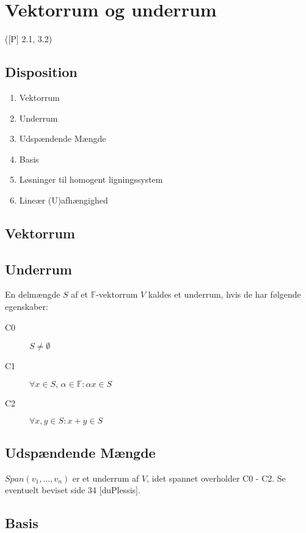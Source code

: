 \newpage
\chapter{Vektorrum og underrum}
([P] 2.1, 3.2)

\section*{Disposition}
\begin{enumerate}
	\item Vektorrum
	\item Underrum
	\item Udspændende Mængde
	\item Basis
	\item Løsninger til homogent ligningssystem
	\item Lineær (U)afhængighed
\end{enumerate}

\section{Vektorrum}




\section{Underrum}
\hypertarget{def:underrum}{}
En delmængde $S$ af et $\mathbb{F}$-vektorrum $V$ kaldes et underrum, hvis de
har følgende egenskaber:
\begin{description}
	\item[C0] $S \not= \emptyset$
	\item[C1] $\forall x \in S, \, \alpha \in \mathbb{F} \colon \alpha x \in S$
	\item[C2] $\forall x,y \in S \colon x + y \in S$
\end{description}

\section{Udspændende Mængde}


$Span(v_1,\dots,v_n)$ er et underrum af $V$, idet spannet overholder C0 - C2.
Se eventuelt beviset side 34 [duPlessis].

\section{Basis}


